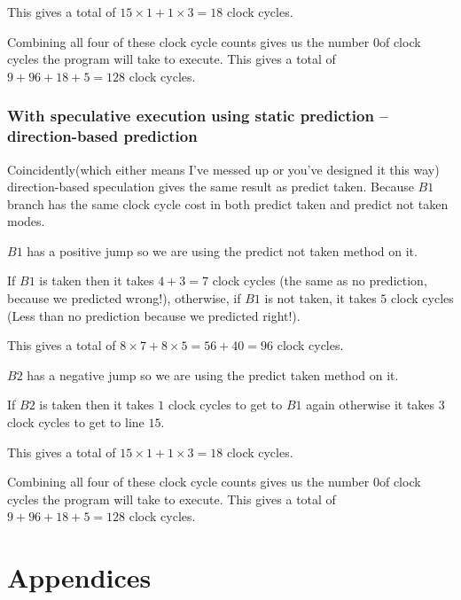 \documentclass[12pt]{article}
\begin{document}
				This gives a total of $15\times1 + 1\times3 = 18$ clock cycles.
				
				
				Combining all four of these clock cycle counts gives us the number 0of clock cycles the program will take to execute.
				This gives a total of $9 + 96 + 18 + 5 = 128$ clock cycles.
				
			\subsubsection{With speculative execution using static prediction – direction-based prediction}

				Coincidently(which either means I've messed up or you've designed it this way) direction-based speculation gives the same result as predict taken. Because $B1$ branch has the same clock cycle cost in both predict taken and predict not taken modes.
				
				$B1$ has a positive jump so we are using the predict not taken method on it.
				
				If $B1$ is taken then it takes $4 + 3 = 7$ clock cycles (the same as no prediction, because we predicted wrong!), otherwise, if $B1$ is not taken, it takes $5$ clock cycles (Less than no prediction because we predicted right!).
				
				This gives a total of $ 8\times7 + 8\times5 = 56 + 40 = 96$ clock cycles.
				
				$B2$ has a negative jump so we are using the predict taken method on it.
				
				If $B2$ is taken then it takes $1$ clock cycles to get to $B1$ again otherwise it takes $3$ clock cycles to get to line $15$.
			
				This gives a total of $15\times1 + 1\times3 = 18$ clock cycles.
				
				
				Combining all four of these clock cycle counts gives us the number 0of clock cycles the program will take to execute.
				This gives a total of $9 + 96 + 18 + 5 = 128$ clock cycles.
				
\newpage
\printbibliography
\newpage

\appendix

\section*{Appendices}
	\renewcommand{\thesubsection}{\Alph{subsection}}

\end{document}
